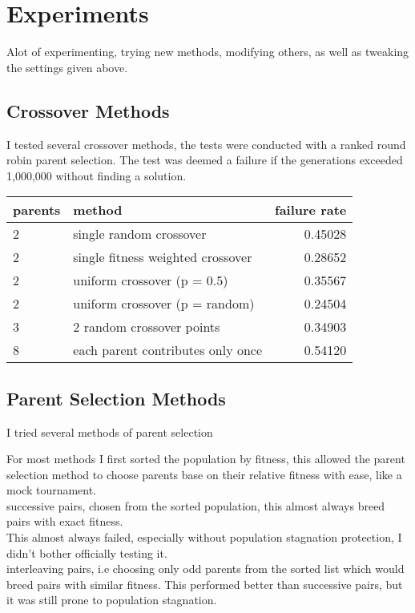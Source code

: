 \documentclass[a4paper,11pt]{article}
\begin{document}
\section*{Experiments}
Alot of experimenting, trying new  methods, modifying others, as well as tweaking the settings given above.

\subsection*{Crossover Methods}
I tested several crossover methods, the tests were conducted with a ranked round robin parent selection.
The test was deemed a failure if the generations exceeded 1,000,000 without finding a solution.


\begin{tabular}{l | l | r }
  parents & method & failure rate \\ \hline
  2 & single random crossover & 0.45028 \\
  2 & single fitness weighted crossover & 0.28652 \\
  2 & uniform crossover (p = 0.5) & 0.35567 \\
  2 & uniform crossover (p = random) & 0.24504 \\
  3 & 2 random crossover points & 0.34903 \\
  8 & each parent contributes only once & 0.54120 \\
\end{tabular}

\subsection*{Parent Selection Methods}

I tried several methods of parent selection

For most methods I first sorted the population by fitness, this allowed the parent selection method to choose parents base on their relative fitness with ease, like a mock tournament.\\

successive pairs, chosen from the sorted population, this almost always breed pairs with exact fitness. \\

This almost always failed, especially without population stagnation protection, I didn't bother officially testing it. \\

interleaving pairs, i.e choosing only odd parents from the sorted list which would breed pairs with similar fitness.
This performed better than successive pairs, but it was still prone to population stagnation. \\
\end{document}
